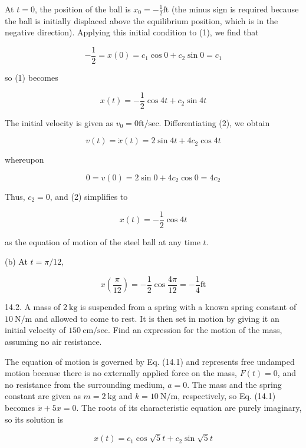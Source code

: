 \documentclass[10pt]{article}
\begin{document}
At $t=0$, the position of the ball is $x_{0}=-\frac{1}{2} \mathrm{ft}$ (the minus sign is required because the ball is initially displaced above the equilibrium position, which is in the negative direction). Applying this initial condition to (1), we find that

$$
-\frac{1}{2}=x(0)=c_{1} \cos 0+c_{2} \sin 0=c_{1}
$$

so (1) becomes


\begin{equation*}
x(t)=-\frac{1}{2} \cos 4 t+c_{2} \sin 4 t \tag{2}
\end{equation*}


The initial velocity is given as $v_{0}=0 \mathrm{ft} / \mathrm{sec}$. Differentiating (2), we obtain

$$
v(t)=\dot{x}(t)=2 \sin 4 t+4 c_{2} \cos 4 t
$$

whereupon

$$
0=v(0)=2 \sin 0+4 c_{2} \cos 0=4 c_{2}
$$

Thus, $c_{2}=0$, and (2) simplifies to


\begin{equation*}
x(t)=-\frac{1}{2} \cos 4 t \tag{3}
\end{equation*}


as the equation of motion of the steel ball at any time $t$.

(b) At $t=\pi / 12$,

$$
x\left(\frac{\pi}{12}\right)=-\frac{1}{2} \cos \frac{4 \pi}{12}=-\frac{1}{4} \mathrm{ft}
$$

14.2. A mass of $2 \mathrm{~kg}$ is suspended from a spring with a known spring constant of $10 \mathrm{~N} / \mathrm{m}$ and allowed to come to rest. It is then set in motion by giving it an initial velocity of $150 \mathrm{~cm} / \mathrm{sec}$. Find an expression for the motion of the mass, assuming no air resistance.

The equation of motion is governed by Eq. (14.1) and represents free undamped motion because there is no externally applied force on the mass, $F(t)=0$, and no resistance from the surrounding medium, $a=0$. The mass and the spring constant are given as $m=2 \mathrm{~kg}$ and $k=10 \mathrm{~N} / \mathrm{m}$, respectively, so Eq. (14.1) becomes $\ddot{x}+5 x=0$. The roots of its characteristic equation are purely imaginary, so its solution is


\begin{equation*}
x(t)=c_{1} \cos \sqrt{5} t+c_{2} \sin \sqrt{5} t \tag{1}
\end{equation*}
\end{document}
